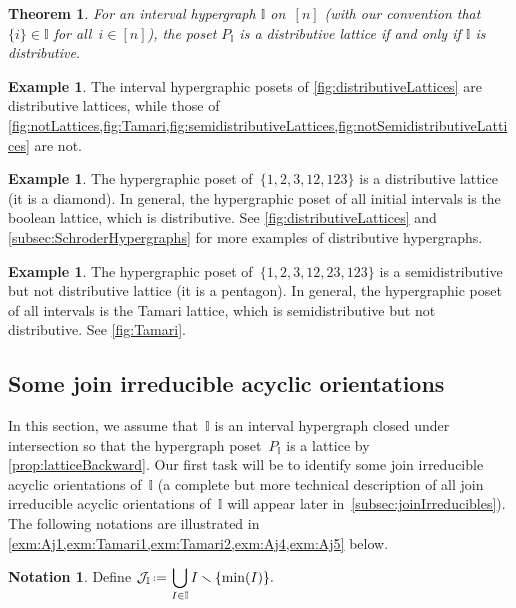 \documentclass{amsart}
\newtheorem{theoremA}{Theorem}
\theoremstyle{definition}
\newtheorem{example}[theorem]{Example}
\newtheorem{notation}[theorem]{Notation}
\newcommand{\cal}[1]{\mathcal{#1}} %
\newcommand{\ssm}{\smallsetminus} %
\newcommand{\eqdef}{\mbox{\,\raisebox{0.2ex}{\scriptsize\ensuremath{\mathrm:}}\ensuremath{=}\,}} %
\newcommand{\II}{\mathbb I} %
\newcommand{\cJ}{\cal{J}} %
\begin{document}
\begin{theoremA}
For an interval hypergraph $\II$ on~$[n]$ (with our convention that~$\{i\} \in \II$ for all~$i \in [n]$), the poset $P_\II$ is a distributive lattice if and only if $\II$ is distributive.
\end{theoremA}

\begin{example}
The interval hypergraphic posets of \cref{fig:distributiveLattices} are distributive lattices, while those of \cref{fig:notLattices,fig:Tamari,fig:semidistributiveLattices,fig:notSemidistributiveLattices} are not.
\end{example}

\begin{example}
The hypergraphic poset of~$\{ 1, 2, 3, 12, 123\}$ is a distributive lattice (it is a diamond).
In general, the hypergraphic poset of all initial intervals is the boolean lattice, which is distributive.
See \cref{fig:distributiveLattices} and \cref{subsec:SchroderHypergraphs} for more examples of distributive hypergraphs.
\end{example}

\begin{example}
The hypergraphic poset of~$\{ 1, 2, 3, 12, 23, 123 \}$ is a semidistributive but not distributive lattice (it is a pentagon).
In general, the hypergraphic poset of all intervals is the Tamari lattice, which is semidistributive but not distributive.
See \cref{fig:Tamari}.
\end{example}


\subsection{Some join irreducible acyclic orientations}  
\label{subsec:someJoinIrreducibles}

In this section, we assume that~$\II$ is an interval hypergraph closed under intersection so that the hypergraph poset~$P_\II$ is a lattice  by \cref{prop:latticeBackward}.
Our first task will be to identify some join irreducible acyclic orientations of~$\II$ (a complete but more technical description of all join irreducible acyclic orientations of~$\II$ will appear later in~\cref{subsec:joinIrreducibles}).
The following notations are illustrated in \cref{exm:Aj1,exm:Tamari1,exm:Tamari2,exm:Aj4,exm:Aj5} below.

\begin{notation}
Define
\(\displaystyle
\cJ_\II \eqdef \bigcup_{I\in \II} I\ssm \{\min(I)\}.
\)
\end{notation}
\end{document}
